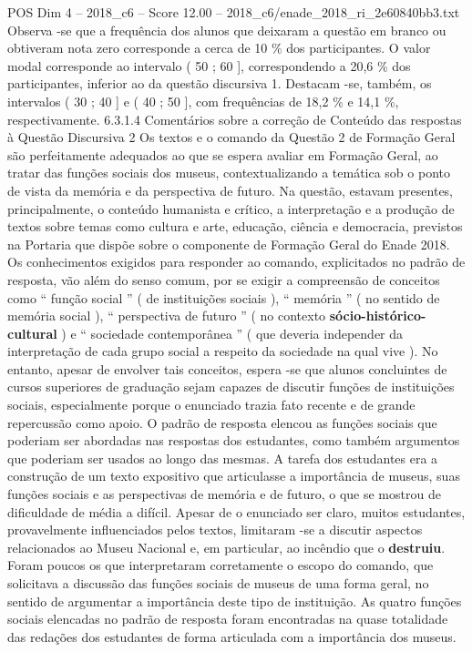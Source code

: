 \begin{textsample}{POS Dim 4 – 2018\_c6 – Score 12.00 – 2018\_c6/enade\_2018\_ri\_2e60840bb3.txt}
Observa -se que a frequência dos alunos que deixaram a questão em branco ou obtiveram nota zero corresponde a cerca de 10 \% dos participantes.
O valor modal corresponde ao intervalo ( 50 ; 60 ], correspondendo a 20,6 \% dos participantes, inferior ao da questão discursiva 1.
Destacam -se, também, os intervalos ( 30 ; 40 ] e ( 40 ; 50 ], com frequências de 18,2 \% e 14,1 \%, respectivamente. 6.3.1.4 Comentários sobre a correção de Conteúdo das respostas à Questão Discursiva 2 Os textos e o comando da Questão 2 de Formação Geral são perfeitamente adequados ao que se espera avaliar em Formação Geral, ao tratar das funções sociais dos museus, contextualizando a temática sob o ponto de vista da memória e da perspectiva de futuro.
Na questão, estavam presentes, principalmente, o conteúdo humanista e crítico, a interpretação e a produção de textos sobre temas como cultura e arte, educação, ciência e democracia, previstos na Portaria que dispõe sobre o componente de Formação Geral do Enade 2018.
Os conhecimentos exigidos para responder ao comando, explicitados no padrão de resposta, vão além do senso comum, por se exigir a compreensão de conceitos como “ função social ” ( de instituições sociais ), “ memória ” ( no sentido de memória social ), “ perspectiva de futuro ” ( no contexto \textbf{sócio-histórico-cultural} ) e “ sociedade contemporânea ” ( que deveria independer da interpretação de cada grupo social a respeito da sociedade na qual vive ).
No entanto, apesar de envolver tais conceitos, espera -se que alunos concluintes de cursos superiores de graduação sejam capazes de discutir funções de instituições sociais, especialmente porque o enunciado trazia fato recente e de grande repercussão como apoio.
O padrão de resposta elencou as funções sociais que poderiam ser abordadas nas respostas dos estudantes, como também argumentos que poderiam ser usados ao longo das mesmas.
A tarefa dos estudantes era a construção de um texto expositivo que articulasse a importância de museus, suas funções sociais e as perspectivas de memória e de futuro, o que se mostrou de dificuldade de média a difícil.
Apesar de o enunciado ser claro, muitos estudantes, provavelmente influenciados pelos textos, limitaram -se a discutir aspectos relacionados ao Museu Nacional e, em particular, ao incêndio que o \textbf{destruiu}.
Foram poucos os que interpretaram corretamente o escopo do comando, que solicitava a discussão das funções sociais de museus de uma forma geral, no sentido de argumentar a importância deste tipo de instituição.
As quatro funções sociais elencadas no padrão de resposta foram encontradas na quase totalidade das redações dos estudantes de forma articulada com a importância dos museus.

\end{textsample}
